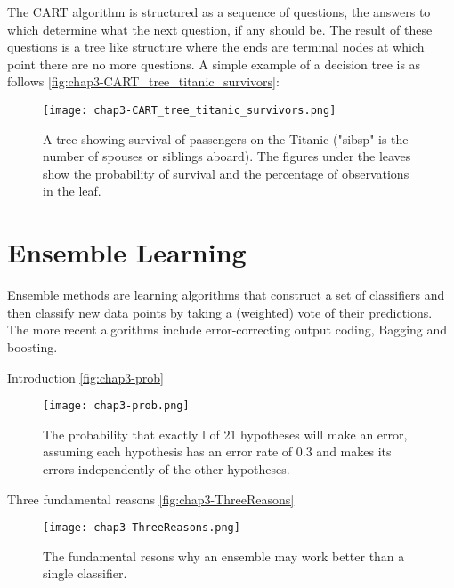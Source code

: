 \begin{compactitem}
The CART algorithm is structured as a sequence of questions, the answers to which determine what the next question, if any should be.  The result of these questions is a tree like structure where the ends are terminal nodes at which point there are no more questions.  A simple example of a decision tree is as follows \autoref{fig:chap3-CART_tree_titanic_survivors}:
\begin{figure}[ht]
  \label{fig:chap3-CART_tree_titanic_survivors}
  \centering
	\texttt{[image: chap3-CART\_tree\_titanic\_survivors.png]}
	\caption{A tree showing survival of passengers on the Titanic ("sibsp" is the number of spouses or siblings aboard). The figures under the leaves show the probability of survival and the percentage of observations in the leaf.}
\end{figure}

\end{compactitem}

\section{Ensemble Learning}
Ensemble methods are learning algorithms that construct a set of classifiers and then classify
new data points by taking a (weighted) vote of their predictions. The more recent algorithms include error-correcting output coding, Bagging and boosting.

\cite{Dietterich:2000:EMM:648054.743935}

\begin{compactitem}

\item {Introduction}
\autoref{fig:chap3-prob}

\begin{figure}[ht]
  \label{fig:chap3-prob}
  \centering
	\texttt{[image: chap3-prob.png]}
	\caption{The probability that exactly l of 21 hypotheses will make an error, assuming each hypothesis has an
	error rate of 0.3 and makes its errors independently of the other hypotheses. }
\end{figure}

\item {Three fundamental reasons}
\autoref{fig:chap3-ThreeReasons}

\begin{figure}[ht]
  \label{fig:chap3-ThreeReasons}
  \centering
	\texttt{[image: chap3-ThreeReasons.png]}
	\caption{The fundamental resons why an ensemble may work better than a single classifier. }
\end{figure}

\end{compactitem}

